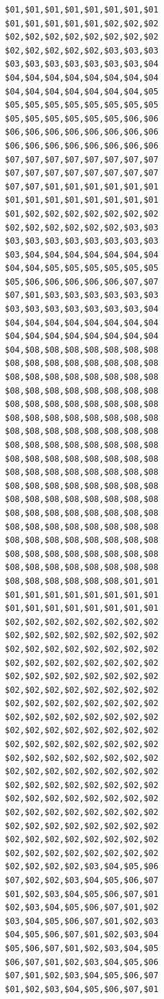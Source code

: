 \hspace{0.1cm}
\begin{minipage}[b]{0.31\linewidth}
\centering
\begin{lstlisting}[basicstyle=\ttfamily\tiny, caption=Color Values]
$01,$01,$01,$01,$01,$01,$01,$01
$01,$01,$01,$01,$01,$02,$02,$02
$02,$02,$02,$02,$02,$02,$02,$02
$02,$02,$02,$02,$02,$03,$03,$03
$03,$03,$03,$03,$03,$03,$03,$04
$04,$04,$04,$04,$04,$04,$04,$04
$04,$04,$04,$04,$04,$04,$04,$05
$05,$05,$05,$05,$05,$05,$05,$05
$05,$05,$05,$05,$05,$05,$06,$06
$06,$06,$06,$06,$06,$06,$06,$06
$06,$06,$06,$06,$06,$06,$06,$06
$07,$07,$07,$07,$07,$07,$07,$07
$07,$07,$07,$07,$07,$07,$07,$07
$07,$07,$01,$01,$01,$01,$01,$01
$01,$01,$01,$01,$01,$01,$01,$01
$01,$02,$02,$02,$02,$02,$02,$02
$02,$02,$02,$02,$02,$02,$03,$03
$03,$03,$03,$03,$03,$03,$03,$03
$03,$04,$04,$04,$04,$04,$04,$04
$04,$04,$05,$05,$05,$05,$05,$05
$05,$06,$06,$06,$06,$06,$07,$07
$07,$01,$03,$03,$03,$03,$03,$03
$03,$03,$03,$03,$03,$03,$03,$04
$04,$04,$04,$04,$04,$04,$04,$04
$04,$04,$04,$04,$04,$04,$04,$04
$04,$08,$08,$08,$08,$08,$08,$08
$08,$08,$08,$08,$08,$08,$08,$08
$08,$08,$08,$08,$08,$08,$08,$08
$08,$08,$08,$08,$08,$08,$08,$08
$08,$08,$08,$08,$08,$08,$08,$08
$08,$08,$08,$08,$08,$08,$08,$08
$08,$08,$08,$08,$08,$08,$08,$08
$08,$08,$08,$08,$08,$08,$08,$08
$08,$08,$08,$08,$08,$08,$08,$08
$08,$08,$08,$08,$08,$08,$08,$08
$08,$08,$08,$08,$08,$08,$08,$08
$08,$08,$08,$08,$08,$08,$08,$08
$08,$08,$08,$08,$08,$08,$08,$08
$08,$08,$08,$08,$08,$08,$08,$08
$08,$08,$08,$08,$08,$08,$08,$08
$08,$08,$08,$08,$08,$08,$08,$08
$08,$08,$08,$08,$08,$08,$08,$08
$08,$08,$08,$08,$08,$08,$01,$01
$01,$01,$01,$01,$01,$01,$01,$01
$01,$01,$01,$01,$01,$01,$01,$01
$02,$02,$02,$02,$02,$02,$02,$02
$02,$02,$02,$02,$02,$02,$02,$02
$02,$02,$02,$02,$02,$02,$02,$02
$02,$02,$02,$02,$02,$02,$02,$02
$02,$02,$02,$02,$02,$02,$02,$02
$02,$02,$02,$02,$02,$02,$02,$02
$02,$02,$02,$02,$02,$02,$02,$02
$02,$02,$02,$02,$02,$02,$02,$02
$02,$02,$02,$02,$02,$02,$02,$02
$02,$02,$02,$02,$02,$02,$02,$02
$02,$02,$02,$02,$02,$02,$02,$02
$02,$02,$02,$02,$02,$02,$02,$02
$02,$02,$02,$02,$02,$02,$02,$02
$02,$02,$02,$02,$02,$02,$02,$02
$02,$02,$02,$02,$02,$02,$02,$02
$02,$02,$02,$02,$02,$02,$02,$02
$02,$02,$02,$02,$02,$02,$02,$02
$02,$02,$02,$02,$02,$02,$02,$02
$02,$02,$02,$02,$03,$04,$05,$06
$07,$02,$02,$03,$04,$05,$06,$07
$01,$02,$03,$04,$05,$06,$07,$01
$02,$03,$04,$05,$06,$07,$01,$02
$03,$04,$05,$06,$07,$01,$02,$03
$04,$05,$06,$07,$01,$02,$03,$04
$05,$06,$07,$01,$02,$03,$04,$05
$06,$07,$01,$02,$03,$04,$05,$06
$07,$01,$02,$03,$04,$05,$06,$07
$01,$02,$03,$04,$05,$06,$07,$01
\end{lstlisting}
\end{minipage}

